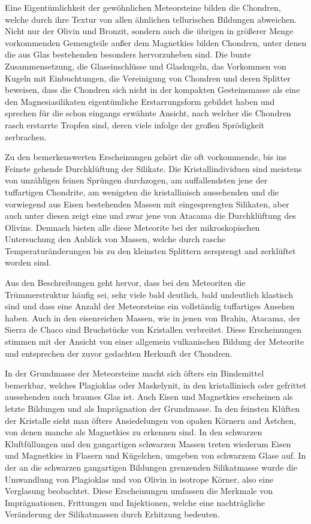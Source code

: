 \documentclass[a4paper, 11pt, oneside, polutonikogreek, german]{article}
\begin{document}
Eine Eigentümlichkeit der gewöhnlichen Meteorsteine bilden die Chondren, welche durch ihre Textur von allen ähnlichen tellurischen Bildungen abweichen. Nicht nur der Olivin und Bronzit, sondern auch die übrigen in größerer Menge vorkommenden Gemengteile außer dem Magnetkies bilden Chondren, unter denen die aus Glas bestehenden besonders hervorzuheben sind. Die bunte Zusammensetzung, die Glaseinschlüsse und Glaskugeln, das Vorkommen von Kugeln mit Einbuchtungen, die Vereinigung von Chondren und deren Splitter beweisen, dass die Chondren sich nicht in der kompakten Gesteinsmasse als eine den Magnesiasilikaten eigentümliche Erstarrungsform gebildet haben und sprechen für die schon eingangs erwähnte Ansicht, nach welcher die Chondren rasch erstarrte Tropfen sind, deren viele infolge der großen Sprödigkeit zerbrachen.

Zu den bemerkenswerten Erscheinungen gehört die oft vorkommende, bis ins Feinste gehende Durchklüftung der Silikate. Die Kristallindividuen sind meistens von unzähligen feinen Sprüngen durchzogen, am auffallendsten jene der tuffartigen Chondrite, am wenigsten die kristallinisch aussehenden und die vorwiegend aus Eisen bestehenden Massen mit eingesprengten Silikaten, aber auch unter diesen zeigt eine und zwar jene von Atacama die Durchklüftung des Olivins. Demnach bieten alle diese Meteorite bei der mikroskopischen Untersuchung den Anblick von Massen, welche durch rasche Temperaturänderungen bis zu den kleinsten Splittern zersprengt and zerklüftet worden sind.

Aus den Beschreibungen geht hervor, dass bei den Meteoriten die Trümmerstruktur häufig sei, sehr viele bald deutlich, bald undeutlich klastisch sind und dass eine Anzahl der Meteorsteine ein vollständig tuffartiges Ansehen haben. Auch in den eisenreichen Massen, wie in jenen von Brahin, Atacama, der Sierra de Chaco sind Bruchstücke von Kristallen verbreitet. Diese Erscheinungen stimmen mit der Ansicht von einer allgemein vulkanischen Bildung der Meteorite und entsprechen der zuvor gedachten Herkunft der Chondren.

In der Grundmasse der Meteorsteine macht sich öfters ein Bindemittel bemerkbar, welches Plagioklas oder Maskelynit, in den kristallinisch oder gefrittet aussehenden auch braunes Glas ist. Auch Eisen und Magnetkies erscheinen als letzte Bildungen und als Imprägnation der Grundmasse. In den feinsten Klüften der Kristalle sieht man öfters Ansiedelungen von opaken Körnern and Ästchen, von denen manche als Magnetkies zu erkennen sind. In den schwarzen Kluftfüllungen und den gangartigen schwarzen Massen treten wiederum Eisen und Magnetkies in Flasern und Kügelchen, umgeben von schwarzem Glase auf. In der an die schwarzen gangartigen Bildungen grenzenden Silikatmasse wurde die Umwandlung von Plagioklas und von Olivin in isotrope Körner, also eine Verglasung beobachtet. Diese Erscheinungen umfassen die Merkmale von Imprägnationen, Frittungen und Injektionen, welche eine nachträgliche Veränderung der Silikatmassen durch Erhitzung bedeuten.
\end{document}
